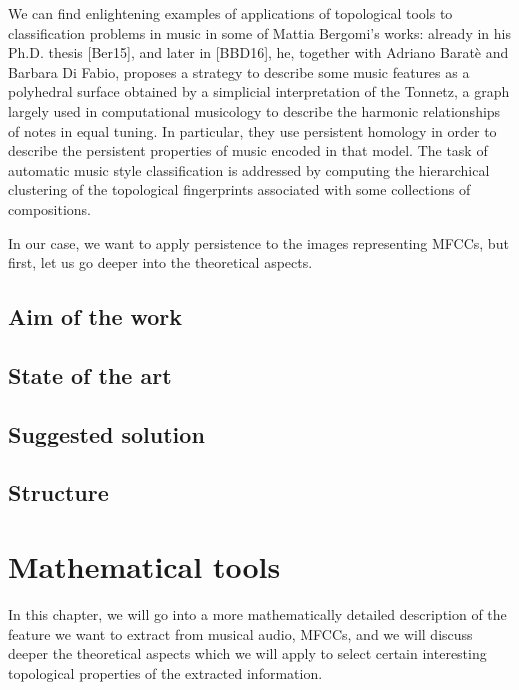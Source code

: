 \documentclass[english, LaM, oneside, noexaminfo]{sapthesis}
\begin{document}
We can find enlightening examples of applications of topological tools to classification problems in music in some of Mattia Bergomi’s works: already in his Ph.D. thesis [Ber15], and later in [BBD16], he, together with Adriano Baratè and Barbara Di Fabio, proposes a strategy to describe some music features as a polyhedral surface obtained by a simplicial interpretation of the Tonnetz, a graph largely used in computational musicology to describe the harmonic relationships of notes in equal tuning. In particular, they use persistent homology in order to describe the persistent properties of music encoded in that model. The task of automatic music style classification is addressed by computing the hierarchical clustering of the topological fingerprints associated with some collections of compositions.


In our case, we want to apply persistence to the images representing MFCCs, but first, let us go deeper into the theoretical aspects.

\section{Aim of the work}
\section{State of the art}
\section{Suggested solution}
\section{Structure}


\chapter{Mathematical tools}

In this chapter, we will go into a more mathematically detailed description of the feature we want to extract from musical audio, MFCCs, and we will discuss deeper the theoretical aspects which we will apply to select certain interesting topological properties of the extracted information.
\end{document}
